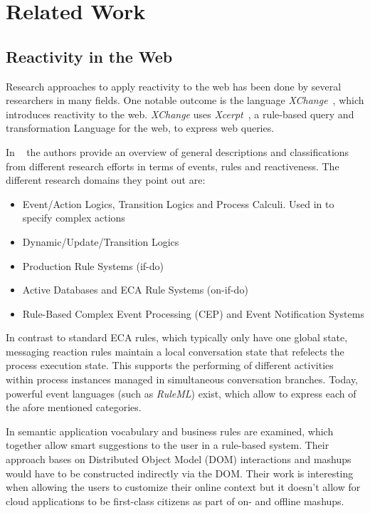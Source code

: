 \documentclass[11pt]{article}%
\begin{document}
\section{Related Work}
\subsection{Reactivity in the Web}
Research approaches to apply reactivity to the web has been done by several researchers in many fields. One notable outcome is the language \emph{XChange}~\cite{2005-Patranjan-TLE.pdf,2005-Bry_etal-XChange.pdf}, which introduces reactivity to the web. \emph{XChange} uses \emph{Xcerpt}~\cite{2004-Schaffert-Xcerpt.pdf}, a rule-based query and transformation Language for the web, to express web queries.

In ~\cite{2009-Paschke_Boley-RCER.pdf} the authors provide an overview of general descriptions and classifications from different research efforts in terms of events, rules and reactiveness. The different research domains they point out are:
 \begin{itemize}
  \item Event/Action Logics, Transition Logics and Process Calculi. Used in \cite{Behrends:2008:EEA:1377798.1377801} to specify complex actions
  \item Dynamic/Update/Transition Logics
  \item Production Rule Systems (if-do)
  \item Active Databases and ECA Rule Systems (on-if-do)
  \item Rule-Based Complex Event Processing (CEP) and Event Notification Systems
\end{itemize}
In contrast to standard ECA rules, which typically only have one global state, messaging reaction rules maintain a local conversation state that refelects the process execution state. This supports the performing of different activities within process instances managed in simultaneous conversation branches. Today, powerful event languages (such as \emph{RuleML}) exist, which allow to express each of the afore mentioned categories.

In \cite{2012-Giurca_etal-RuleTheWeb.pdf} semantic application vocabulary and business rules are examined, which together allow smart suggestions to the user in a rule-based system. Their approach bases on Distributed Object Model (DOM) interactions and mashups would have to be constructed indirectly via the DOM. Their work is interesting when allowing the users to customize their online context but it doesn't allow for cloud applications to be first-class citizens as part of on- and offline mashups.
\end{document}
